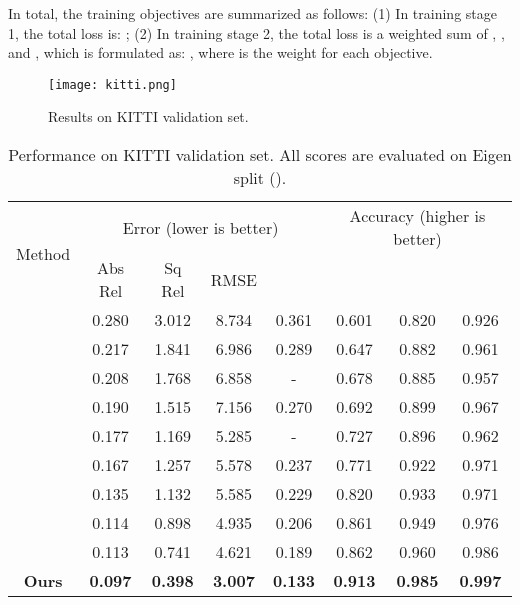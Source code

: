 \documentclass[letterpaper]{article} \usepackage{aaai20}  \usepackage{times}  \usepackage{helvet} \usepackage{courier}  \usepackage{graphicx} \frenchspacing  \setlength{\pdfpagewidth}{8.5in}  \setlength{\pdfpageheight}{11in}  \usepackage{epsfig}
\begin{document}
    In total, the training objectives are summarized as follows: (1) In training stage 1, the total loss is:
    ; (2) In training stage 2, the total loss is a weighted sum of , ,  and , which is formulated as: , where  is the weight for each objective.
    
    \begin{figure*}[t]
    \begin{center}
    \texttt{[image: kitti.png]}
    \end{center}
       \vspace{-12pt}
       \caption{Results on KITTI validation set.}
    \label{fig:kitti}
    \vspace{-8pt}
    \end{figure*}
    
    \begin{table*}[t]
    \centering
    \vspace{-5pt}
    \caption{Performance on KITTI validation set. All scores are evaluated on Eigen split (\cite{Eigen2015Predicting}).}
    \label{tab:kitti}
    \small
    \setlength\tabcolsep{4pt}
    \begin{tabular}{|c|c|c|c|c|c|c|c|}
    \hline
    \multirow{2}{*}{Method} & \multicolumn{4}{c|}{Error (lower is better)} & \multicolumn{3}{c|}{Accuracy (higher is better)}\\
    & Abs Rel  & Sq Rel  & RMSE  &    &  &  &  \\ \hline
    \cite{Saxena2009Make3D}   & 0.280     & 3.012  & 8.734   & 0.361     & 0.601  & 0.820   & 0.926 \\ \hline
    \cite{Liu2016Learning}   & 0.217     & 1.841 & 6.986   & 0.289     & 0.647  & 0.882    & 0.961 \\ \hline 
    \cite{Zhou2017Unsupervised} & 0.208     & 1.768      & 6.858   & -  & 0.678   & 0.885 & 0.957    \\ \hline
    \cite{Eigen2014Depth}    & 0.190     & 1.515      & 7.156   & 0.270     & 0.692   & 0.899  & 0.967   \\ \hline
    \cite{Garg2016Unsupervised} & 0.177 &1.169 & 5.285 & - & 0.727& 0.896 & 0.962 \\ \hline
    \cite{Kundu2018AdaDepth}   & 0.167     & 1.257      & 5.578   & 0.237    & 0.771   & 0.922    & 0.971   \\ \hline
    \cite{Zhan2018Unsupervised} &0.135 &1.132& 5.585& 0.229& 0.820& 0.933& 0.971 \\ \hline
    \cite{Godard2017Unsupervised}   & 0.114     & 0.898      & 4.935   & 0.206     & 0.861   & 0.949   & 0.976  \\ \hline
    \cite{Kuznietsov2017Semi}   & 0.113     & 0.741      & 4.621   & 0.189     & 0.862  & 0.960  & 0.986  \\ \hline
    \textbf{Ours}    &\textbf{0.097}    & \textbf{0.398}     &\textbf{3.007}  & \textbf{0.133}   &\textbf{0.913} & \textbf{0.985}  & \textbf{0.997} \\ \hline
    \end{tabular}
    \vspace{-6pt}
    \end{table*}
    
\end{document}
